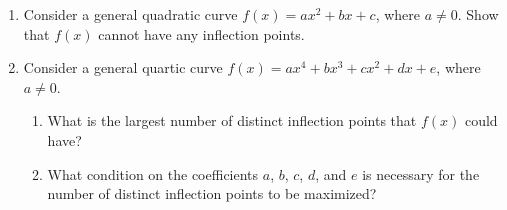 \documentclass[12pt]{article}
\begin{document}
\begin{enumerate}
\item Consider a general quadratic curve $f(x)=ax^2+bx+c$, where $a \neq 0$.  Show that $f(x)$ cannot have any inflection points.



\item Consider a general quartic curve $f(x)=ax^4+bx^3+cx^2+dx+e$, where $a \neq 0$.  

\begin{enumerate}

\item What is the largest number of distinct inflection points that $f(x)$ could have?  


\item What condition on the coefficients $a$, $b$, $c$, $d$, and $e$ is necessary for the number of distinct inflection points to be maximized?


\end{enumerate}

\end{enumerate}
\end{document}
